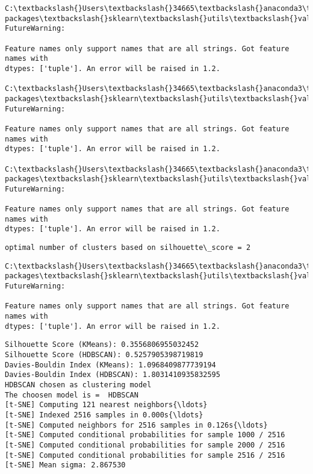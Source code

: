 \documentclass[11pt]{article}
\begin{document}
\begin{Verbatim}[commandchars=\\\{\}]
C:\textbackslash{}Users\textbackslash{}34665\textbackslash{}anaconda3\textbackslash{}lib\textbackslash{}site-packages\textbackslash{}sklearn\textbackslash{}utils\textbackslash{}validation.py:1688:
FutureWarning:

Feature names only support names that are all strings. Got feature names with
dtypes: ['tuple']. An error will be raised in 1.2.

C:\textbackslash{}Users\textbackslash{}34665\textbackslash{}anaconda3\textbackslash{}lib\textbackslash{}site-packages\textbackslash{}sklearn\textbackslash{}utils\textbackslash{}validation.py:1688:
FutureWarning:

Feature names only support names that are all strings. Got feature names with
dtypes: ['tuple']. An error will be raised in 1.2.

C:\textbackslash{}Users\textbackslash{}34665\textbackslash{}anaconda3\textbackslash{}lib\textbackslash{}site-packages\textbackslash{}sklearn\textbackslash{}utils\textbackslash{}validation.py:1688:
FutureWarning:

Feature names only support names that are all strings. Got feature names with
dtypes: ['tuple']. An error will be raised in 1.2.

    \end{Verbatim}

    \begin{Verbatim}[commandchars=\\\{\}]
optimal number of clusters based on silhouette\_score = 2
    \end{Verbatim}

    \begin{Verbatim}[commandchars=\\\{\}]
C:\textbackslash{}Users\textbackslash{}34665\textbackslash{}anaconda3\textbackslash{}lib\textbackslash{}site-packages\textbackslash{}sklearn\textbackslash{}utils\textbackslash{}validation.py:1688:
FutureWarning:

Feature names only support names that are all strings. Got feature names with
dtypes: ['tuple']. An error will be raised in 1.2.

    \end{Verbatim}

    \begin{Verbatim}[commandchars=\\\{\}]
Silhouette Score (KMeans): 0.3556806955032452
Silhouette Score (HDBSCAN): 0.5257905398719819
Davies-Bouldin Index (KMeans): 1.0968409877739194
Davies-Bouldin Index (HDBSCAN): 1.8031410935832595
HDBSCAN chosen as clustering model
The choosen model is =  HDBSCAN
[t-SNE] Computing 121 nearest neighbors{\ldots}
[t-SNE] Indexed 2516 samples in 0.000s{\ldots}
[t-SNE] Computed neighbors for 2516 samples in 0.126s{\ldots}
[t-SNE] Computed conditional probabilities for sample 1000 / 2516
[t-SNE] Computed conditional probabilities for sample 2000 / 2516
[t-SNE] Computed conditional probabilities for sample 2516 / 2516
[t-SNE] Mean sigma: 2.867530
    \end{Verbatim}
\end{document}
